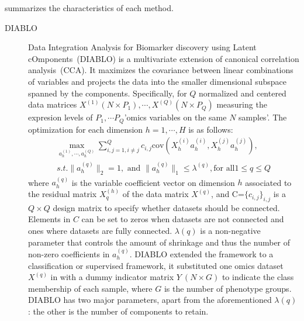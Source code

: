   summarizes the characteristics of each method.

\begin{description}
  \item[DIABLO]
  Data Integration Analysis for Biomarker discovery using Latent cOmponents~(DIABLO) is a multivariate extension of canonical correlation analysis~(CCA). It maximizes the covariance between linear combinations of variables and projects the data into the smaller dimensional subspace spanned by the components. Specifically, for $Q$ normalized and centered data matrices $X^{(1)}(N\times P_1), \cdots, X^{(Q)}(N\times P_Q)$ measuring the expresion levels of $P_1,\cdots P_Q$'omics variables on the same $N$ samples'. The optimization for each dimension $h=1,\cdots, H$ is as follows:
  \begin{equation}
  \begin{aligned}
  	\underset{a_h^{(1)},\cdots,a_h^{(Q)}}{\max} \sum_{i,j=1, i\neq j}^Q c_{i,j} \text{cov}(X_h^{(i)} a_h^{(i)}, X_h^{(j)} a_h^{(j)}),\\
  	s.t. \|a_h^{(q)}\|_2 = 1, \text{ and } \|a_h^{(q)}\|_1 \leq \lambda^{(q)}, \text{for all} 1\leq q \leq Q
  \end{aligned}
  \label{eqn:sGCCA}
  \end{equation}
  where $a_h^{(q)}$ is the variable coefficient vector on dimension $h$ associated to the residual matrix $X_q^{(h)}$ of the data matrix $X^{(q)}$, and C=$\{c_{i,j}\}_{i,j}$ is a $Q\times Q$ design matrix to specify whether datasets should be connected. Elements in $C$ can be set to zeros when datasets are not connected and ones where datasets are fully connected. $\lambda(q)$ is a non-negative parameter that controls the amount of shrinkage and thus the number of non-zero coefficients in $a_h^{(q)}$. DIABLO extended the framework to a classification or supervised framework, it substituted one omics dataset $X^{(q)}$ in  with a dummy indicator matrix $Y\ (N\times G)$ to indicate the class membership of each sample, where $G$ is the number of phenotype groups. DIABLO has two major parameters, apart from the aforementioned $\lambda(q)$: the other is the number of components to retain. 



\end{description}
